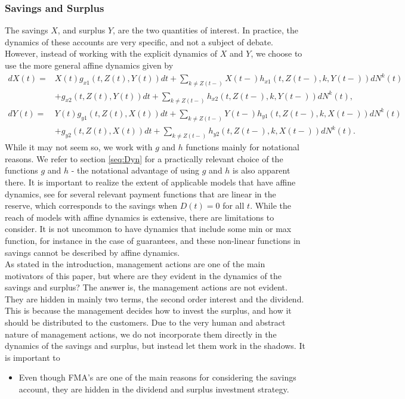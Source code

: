 \documentclass[12pt]{article}
\theoremstyle{my_thm}
\begin{document}
\subsubsection{Savings and Surplus}
The savings $X$, and surplus $Y$, are the two quantities of interest. In practice, the dynamics of these accounts are very specific, and not a subject of debate. However, instead of working with the explicit dynamics of $X$ and $Y$, we choose to use the more general affine dynamics given by
\begin{align*}
dX(t)=&X(t)g_{x1}(t,Z(t),Y(t))dt + \sum_{k \neq Z(t-)} X(t-) h_{x1}(t,Z(t-),k,Y(t-)) dN^k(t)\\
&+g_{x2}(t,Z(t),Y(t))dt + \sum_{k \neq Z(t-)} h_{x2}(t,Z(t-),k,Y(t-)) dN^k(t),
\\
dY(t)=&Y(t)g_{y1}(t,Z(t),X(t))dt + \sum_{k \neq Z(t-)} Y(t-) h_{y1}(t,Z(t-),k,X(t-)) dN^k(t)
\\
&+g_{y2}(t,Z(t),X(t))dt + \sum_{k \neq Z(t-)} h_{y2}(t,Z(t-),k,X(t-)) dN^k(t).
\end{align*}
While it may not seem so, we work with $g$ and $h$ functions mainly for notational reasons. We refer to section \ref{seq:Dyn} for a practically relevant choice of the functions $g$ and $h$ - the notational advantage of using $g$ and $h$ is also apparent there. It is important to realize the extent of applicable models that have affine dynamics, see \citet{Christiansen} for several relevant payment functions that are linear in the reserve, which corresponds to the savings when $D(t)=0$ for all $t$. While the reach of models with affine dynamics is extensive, there are limitations to consider. It is not uncommon to have dynamics that include some min or max function, for instance in the case of guarantees, and these non-linear functions in savings cannot be described by affine dynamics. \\
As stated in the introduction, management actions are one of the main motivators of this paper, but where are they evident in the dynamics of the savings and surplus? The answer is, the management actions are not evident. They are hidden in mainly two terms, the second order interest and the dividend. This is because the management decides how to invest the surplus, and how it should be distributed to the customers. Due to the very human and abstract nature of management actions, we do not incorporate them directly in the dynamics of the savings and surplus, but instead let them work in the shadows. It is important to 


\begin{itemize}
\item Even though FMA's are one of the main reasons for considering the savings account, they are hidden in the dividend and surplus investment strategy.
\end{itemize}
\end{document}
